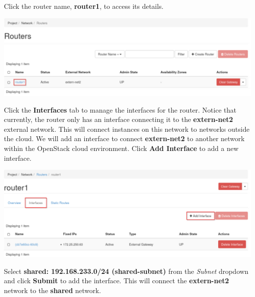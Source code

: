 \documentclass[letterpaper, 12pt]{article}
\begin{document}
\begin{enumerate}
    \begin{labstep}
        Click the router name, \textbf{router1}, to access its details.

        \begin{center}
            \includegraphics[width=\linewidth]{images/part2/step4.png}
        \end{center}
    \end{labstep}

    \begin{labstep}
        Click the \textbf{Interfaces} tab to manage the interfaces for the router.
        Notice that currently, the router only has an interface connecting it to the \textbf{extern-net2} external network.
        This will connect instances on this network to networks outside the cloud.
        We will add an interface to connect \textbf{extern-net2} to another network within the OpenStack cloud environment.
        Click \textbf{Add Interface} to add a new interface.

        \begin{center}
            \includegraphics[width=\linewidth]{images/part2/step5.png}
        \end{center}
    \end{labstep}

    \begin{labstep}
        Select \textbf{shared: 192.168.233.0/24 (shared-subnet)} from the \textit{Subnet} dropdown and click \textbf{Submit} to add the interface.
        This will connect the \textbf{extern-net2} network to the \textbf{shared} network.


\end{labstep}
\end{enumerate}
\end{document}
